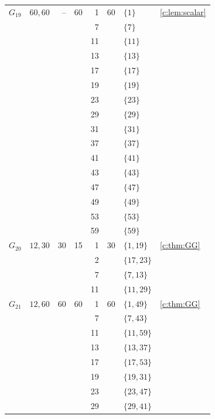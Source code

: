 \documentclass[10pt,a4paper]{amsart}
\theoremstyle{definition}
\begin{document}
\begin{longtable}{@{}lL{.24\textwidth}rrrrL{.26\textwidth}L{.14\textwidth}@{}}
\midrule[.25pt]
$G_{19}$ & $60,\allowbreak 60$ & -- & 60 & 1 & 60 & $\{1\}$ & \cref{c:lem:scalar} \\*
 &  &  &  & 7 &  & $\{7\}$ &  \\*
 &  &  &  & 11 &  & $\{11\}$ &  \\*
 &  &  &  & 13 &  & $\{13\}$ &  \\*
 &  &  &  & 17 &  & $\{17\}$ &  \\*
 &  &  &  & 19 &  & $\{19\}$ &  \\*
 &  &  &  & 23 &  & $\{23\}$ &  \\*
 &  &  &  & 29 &  & $\{29\}$ &  \\*
 &  &  &  & 31 &  & $\{31\}$ &  \\*
 &  &  &  & 37 &  & $\{37\}$ &  \\*
 &  &  &  & 41 &  & $\{41\}$ &  \\*
 &  &  &  & 43 &  & $\{43\}$ &  \\*
 &  &  &  & 47 &  & $\{47\}$ &  \\*
 &  &  &  & 49 &  & $\{49\}$ &  \\*
 &  &  &  & 53 &  & $\{53\}$ &  \\*
 &  &  &  & 59 &  & $\{59\}$ &  \\
\midrule[.25pt]
$G_{20}$ & $12,\allowbreak 30$ & 30 & 15 & 1 & 30 & $\{1,\allowbreak 19\}$ & \cref{c:thm:GG} \\*
 &  &  &  & 2 &  & $\{17,\allowbreak 23\}$ &  \\*
 &  &  &  & 7 &  & $\{7,\allowbreak 13\}$ &  \\*
 &  &  &  & 11 &  & $\{11,\allowbreak 29\}$ &  \\
\midrule[.25pt]
$G_{21}$ & $12,\allowbreak 60$ & 60 & 60 & 1 & 60 & $\{1,\allowbreak 49\}$ & \cref{c:thm:GG} \\*
 &  &  &  & 7 &  & $\{7,\allowbreak 43\}$ &  \\*
 &  &  &  & 11 &  & $\{11,\allowbreak 59\}$ &  \\*
 &  &  &  & 13 &  & $\{13,\allowbreak 37\}$ &  \\*
 &  &  &  & 17 &  & $\{17,\allowbreak 53\}$ &  \\*
 &  &  &  & 19 &  & $\{19,\allowbreak 31\}$ &  \\*
 &  &  &  & 23 &  & $\{23,\allowbreak 47\}$ &  \\*
 &  &  &  & 29 &  & $\{29,\allowbreak 41\}$ &  \\

\end{longtable}
\end{document}
